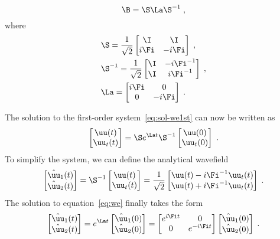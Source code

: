 \begin{equation}
\B = \S \La \S^{-1} \;,
\end{equation}
where 
\begin{eqnarray}
&\S = \frac{1}{\sqrt{2}} \begin{bmatrix} \I & \I \\ i\Fi & -i\Fi \end{bmatrix} \;, \\
&\S^{-1} = \frac{1}{\sqrt{2}} \begin{bmatrix} \I & -i\Fi^{-1} \\ \I & i\Fi^{-1} \end{bmatrix} \;, \nonumber \\
&\La = \begin{bmatrix} i\Fi & 0 \\ 0 & -i\Fi \end{bmatrix} \;. \nonumber
\end{eqnarray}

The solution to the first-order system~\ref{eq:sol-we1st} can now be written as
\begin{equation}
\begin{bmatrix} \uu(t) \\ \uu_t(t) \end{bmatrix} = \S e^{\La t} \S^{-1} \begin{bmatrix} \uu(0) \\ \uu_t(0) \end{bmatrix} \;.
\end{equation}
To simplify the system, we can define the analytical wavefield
\begin{equation}
\begin{bmatrix} \hat{\uu}_1(t) \\ \hat{\uu}_2(t) \end{bmatrix} = \S^{-1} \begin{bmatrix} \uu(t) \\ \uu_t(t) \end{bmatrix} = \frac{1}{\sqrt{2}}  \begin{bmatrix}  \uu(t)-i\Fi^{-1}\uu_t(t) \\ \uu(t)+i\Fi^{-1}\uu_t(t) \end{bmatrix} \;.
\end{equation}
The solution to equation~\ref{eq:we} finally takes the form
\begin{equation}
    \label{eq:osteps}
\begin{bmatrix} \hat{\uu}_1(t) \\ \hat{\uu}_2(t) \end{bmatrix} = e^{\La t} \begin{bmatrix} \hat{\uu}_1(0) \\ \hat{\uu}_2(0) \end{bmatrix} = \begin{bmatrix} e^{i\Fi t} & 0 \\ 0 & e^{-i\Fi t} \end{bmatrix} \begin{bmatrix} \hat{\uu}_1(0) \\ \hat{\uu}_2(0) \end{bmatrix} \;.
\end{equation}

